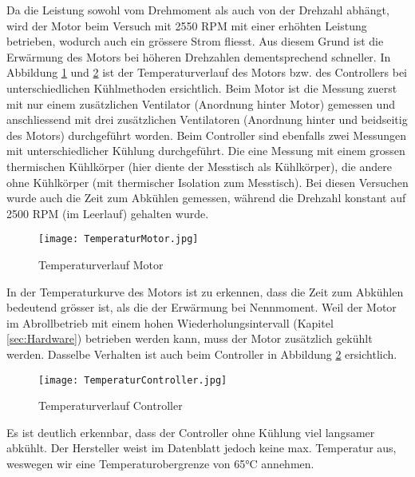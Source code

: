 Da die Leistung sowohl vom Drehmoment als auch von der Drehzahl abhängt, wird  der Motor beim Versuch mit 2550 RPM mit einer erhöhten Leistung betrieben, wodurch auch ein grössere Strom fliesst. Aus diesem Grund ist die Erwärmung des Motors bei höheren Drehzahlen dementsprechend schneller. In Abbildung \ref{fig:TemperaturMotor} und \ref{fig:TemperaturController} ist der Temperaturverlauf des Motors bzw. des Controllers bei unterschiedlichen Kühlmethoden ersichtlich. Beim Motor ist die Messung zuerst mit nur einem zusätzlichen Ventilator (Anordnung hinter Motor) gemessen und anschliessend mit drei zusätzlichen Ventilatoren (Anordnung hinter und beidseitig des Motors) durchgeführt worden. Beim Controller sind ebenfalls zwei Messungen mit unterschiedlicher Kühlung durchgeführt. Die eine Messung mit einem grossen thermischen Kühlkörper (hier diente der Messtisch als Kühlkörper), die andere ohne Kühlkörper (mit thermischer Isolation zum Messtisch). Bei diesen Versuchen wurde auch die Zeit zum Abkühlen gemessen, während die Drehzahl konstant auf 2500 RPM (im Leerlauf) gehalten wurde.


\begin{figure}[H]
	\centering
	\texttt{[image: TemperaturMotor.jpg]}
	\caption{Temperaturverlauf Motor}\label{fig:TemperaturMotor}
\end{figure}

In der Temperaturkurve des Motors ist zu erkennen, dass die Zeit zum Abkühlen bedeutend grösser ist, als die der Erwärmung bei Nennmoment. Weil der Motor im Abrollbetrieb mit einem hohen Wiederholungsintervall (Kapitel \ref{sec:Hardware}) betrieben werden kann, muss der Motor zusätzlich gekühlt werden. Dasselbe Verhalten ist auch beim Controller in Abbildung \ref{fig:TemperaturController} ersichtlich.

\begin{figure}[H]
	\centering
	\texttt{[image: TemperaturController.jpg]}
	\caption{Temperaturverlauf Controller}\label{fig:TemperaturController}
\end{figure}

Es ist deutlich erkennbar, dass der Controller ohne Kühlung viel langsamer abkühlt. Der Hersteller weist im Datenblatt\cite{ControllerUserGuide} jedoch keine max. Temperatur aus, weswegen wir eine Temperaturobergrenze von 65°C annehmen.